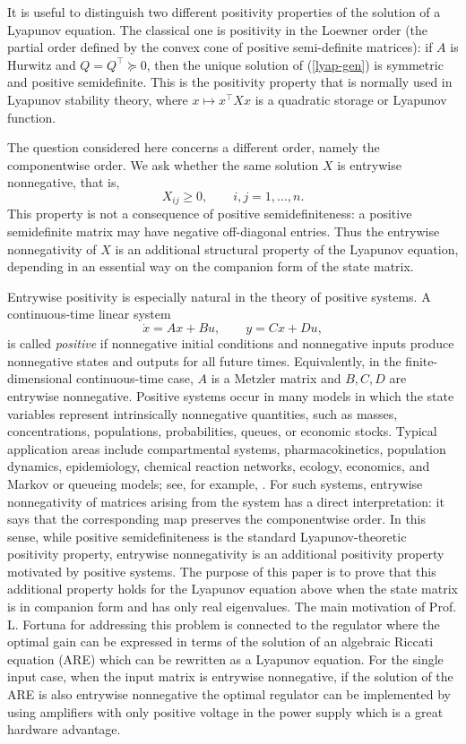 \documentclass[10pt,a4paper]{amsart}
\newcommand{\tp}{^{\top}}
\begin{document}
It is useful to distinguish two different positivity properties of the
solution of a Lyapunov equation.  The classical one is positivity in the
Loewner order (the partial order defined by the convex cone of positive semi-definite matrices): if $A$ is Hurwitz and $Q=Q\tp\succeq0$, then the unique
solution of (\ref{lyap-gen})
is symmetric and positive semidefinite.  This is the positivity property that
is normally used in Lyapunov stability theory, where $x\mapsto x\tp Xx$ is a
quadratic storage or Lyapunov function.

The question considered here concerns a different order, namely the
componentwise order.  We ask whether the same solution $X$ is entrywise
nonnegative, that is,
\[
X_{ij}\ge0,\qquad i,j=1,\dots,n.
\]
This property is not a  consequence of positive semidefiniteness: a
positive semidefinite matrix may have negative off-diagonal entries.  Thus the
entrywise nonnegativity of $X$ is an additional structural property of the
Lyapunov equation, depending in an essential way on the companion form of the
state matrix.

Entrywise positivity is especially natural in the theory of positive systems.
A continuous-time linear system
\[
\dot x=Ax+Bu,\qquad y=Cx+Du,
\]
is called {\em positive} if nonnegative initial conditions and nonnegative inputs
produce nonnegative states and outputs for all future times.  Equivalently, in
the finite-dimensional continuous-time case, $A$ is a Metzler matrix and
$B,C,D$ are entrywise nonnegative.  Positive systems occur in many models in
which the state variables represent intrinsically nonnegative quantities, such
as masses, concentrations, populations, probabilities, queues, or economic
stocks.  Typical application areas include compartmental systems,
pharmacokinetics, population dynamics, epidemiology, chemical reaction
networks, ecology, economics, and Markov or queueing models; see, for example,
\cite{Luenberger1979,FarinaRinaldi2000,BermanPlemmons1994}.
For such systems, entrywise nonnegativity of matrices arising from the system
has a direct interpretation: it says that the corresponding map preserves the
componentwise order.  In this sense, while positive semidefiniteness is the
standard Lyapunov-theoretic positivity property, entrywise nonnegativity is an
additional positivity property motivated by positive systems.  The purpose of
this paper is to prove that this additional property holds for the Lyapunov
equation above when the state matrix is in companion form and has only real
eigenvalues. The main motivation of Prof. L. Fortuna for addressing this problem is connected to the regulator where the optimal gain can be expressed in terms of the solution of an algebraic Riccati equation (ARE) which can be rewritten as a Lyapunov equation. For the single input case, when the input matrix is entrywise nonnegative, if the solution of the ARE is also entrywise  nonnegative
the optimal regulator can be implemented by using amplifiers with only positive 
voltage in the power supply which is a great hardware advantage. 
\end{document}
